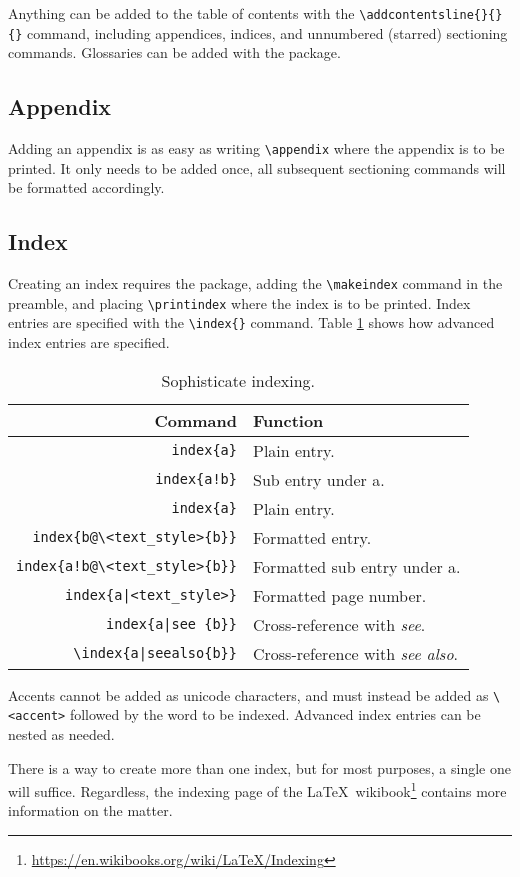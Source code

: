 Anything can be added to the table of contents with the
\verb|\addcontentsline{}{}{}| command, including appendices, indices,
and unnumbered (starred) sectioning commands.  Glossaries can be added
with the  package.
%
\subsection{Appendix}
%
Adding an appendix is as easy as writing \verb|\appendix| where the
appendix is to be printed.  It only needs to be added once, all
subsequent sectioning commands will be formatted accordingly.
%
\subsection{Index}
%
Creating an index requires the  package, adding the
\verb|\makeindex| command in the preamble, and placing
\verb|\printindex| where the index is to be printed.  Index entries
are specified with the \verb|\index{}| command.  Table \ref{t:index}
shows how advanced index entries are specified.
\begin{table}[!htbp]
  \centering
  \caption{Sophisticate indexing.}
  \label{t:index}
  \begin{tabular}{rl}
    \toprule
    Command & Function \\
    \midrule
    \verb|index{a}| & Plain entry. \\
    \verb|index{a!b}| & Sub entry under a. \\
    \verb|index{a}| & Plain entry. \\
    \verb|index{b@\<text_style>{b}}| & Formatted entry. \\
    \verb|index{a!b@\<text_style>{b}}| & Formatted sub entry under a. \\
    \verb+index{a|<text_style>}+ & Formatted page number. \\
    \verb+index{a|see {b}}+ & Cross-reference with \emph{see}. \\
    \verb+\index{a|seealso{b}}+ & Cross-reference with \emph{see also}.\\
    \bottomrule
  \end{tabular}
\end{table}
Accents cannot be added as unicode characters, and must instead be
added as \verb|\<accent>| followed by the word to be indexed.
Advanced index entries can be nested as needed.

There is a way to create more than one index, but for most purposes, a
single one will suffice.  Regardless, the indexing page of the
\LaTeX~wikibook\footnote{\url{https://en.wikibooks.org/wiki/LaTeX/Indexing}}
contains more information on the matter.
%
